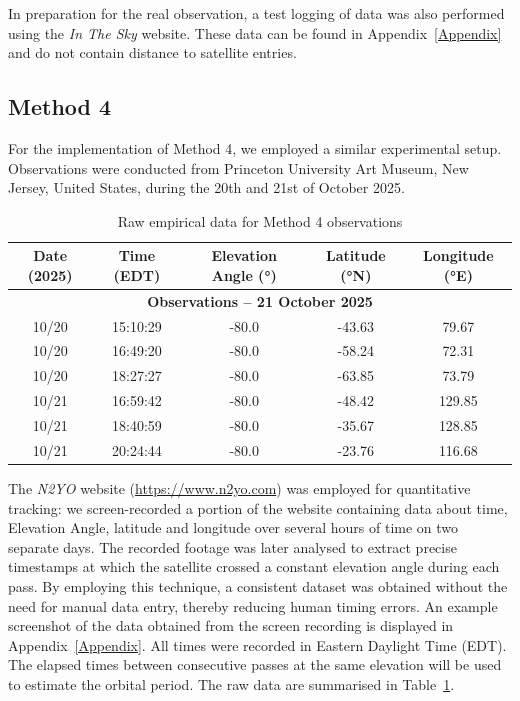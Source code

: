 \documentclass{article}
\begin{document}
In preparation for the real observation, a test logging of data was also performed using the \textit{In The Sky} website. These data can be found in Appendix~\ref{Appendix} and do not contain distance to satellite entries.

\subsection{Method 4}

For the implementation of Method 4, we employed a similar experimental setup. Observations were conducted from Princeton University Art Museum, New Jersey, United States, during the 20th and 21st of October 2025.

\begin{table}[H]
    \centering
    \caption{Raw empirical data for Method 4 observations}
    \label{tab:method4_data}
    \renewcommand{\arraystretch}{1.2}
    \begin{tabular}{|c|c|c|c|c|}
        \hline
        \textbf{Date (2025)} & \textbf{Time (EDT)} & \textbf{Elevation Angle (°)} & \textbf{Latitude (°N)} & \textbf{Longitude (°E)} \\ \hline
        \multicolumn{5}{|c|}{\textbf{Observations – 21 October 2025}} \\ \hline
        10/20 & 15:10:29 & -80.0 & -43.63 & 79.67\\ \hline
        10/20 & 16:49:20 & -80.0 & -58.24 & 72.31\\ \hline
        10/20 & 18:27:27 & -80.0 & -63.85 & 73.79\\ \hline
        10/21 & 16:59:42 & -80.0 & -48.42 & 129.85\\ \hline
        10/21 & 18:40:59 & -80.0 & -35.67 & 128.85\\ \hline
        10/21 & 20:24:44 & -80.0 & -23.76 & 116.68 \\ \hline
    \end{tabular}
\end{table}


 The \textit{N2YO} website (\href{https://www.n2yo.com}{https://www.n2yo.com}) was employed for quantitative tracking: we screen-recorded a portion of the website containing data about time, Elevation Angle, latitude and longitude over several hours of time on two separate days. The recorded footage was later analysed to extract precise timestamps at which the satellite crossed a constant elevation angle during each pass. By employing this technique, a consistent dataset was obtained without the need for manual data entry, thereby reducing human timing errors. An example screenshot of the data obtained from the screen recording is displayed in Appendix~\ref{Appendix}. All times were recorded in Eastern Daylight Time (EDT). The elapsed times between consecutive passes at the same elevation will be used to estimate the orbital period. The raw data are summarised in Table~\ref{tab:method4_data}.
\end{document}
